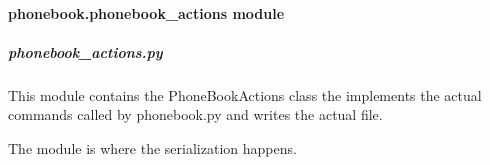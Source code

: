 \documentclass[letterpaper,10pt,english]{sphinxmanual}
\begin{document}
\paragraph{phonebook.phonebook\_actions module}
\label{\detokenize{phonebook:module-phonebook.phonebook_actions}}\label{\detokenize{phonebook:phonebook-phonebook-actions-module}}

\subparagraph{phonebook\_actions.py}
\label{\detokenize{phonebook:phonebook-actions-py}}
This module contains the PhoneBookActions class the implements the actual commands called by phonebook.py
and writes the actual file.

The {\hyperref[\detokenize{phonebook.supported_filetypes:module-phonebook.supported_filetypes.filetypes}]{}} module is where the serialization happens.
\end{document}
